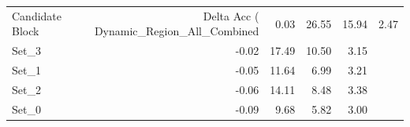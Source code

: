 \begin{tabular}{lrrrr}
\toprule
Candidate Block & Delta Acc (%
\midrule
Dynamic_Region_All_Combined & 0.03 & 26.55 & 15.94 & 2.47 \\
Set_3 & -0.02 & 17.49 & 10.50 & 3.15 \\
Set_1 & -0.05 & 11.64 & 6.99 & 3.21 \\
Set_2 & -0.06 & 14.11 & 8.48 & 3.38 \\
Set_0 & -0.09 & 9.68 & 5.82 & 3.00 \\
\bottomrule
\end{tabular}
